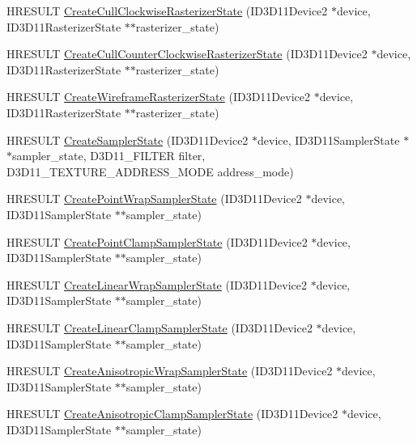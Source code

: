 \begin{DoxyCompactItemize}
\item 
H\+R\+E\+S\+U\+LT \hyperlink{namespacemage_a033a0ae29692c9fc223e532b7487aed5}{Create\+Cull\+Clockwise\+Rasterizer\+State} (I\+D3\+D11\+Device2 $\ast$device, I\+D3\+D11\+Rasterizer\+State $\ast$$\ast$rasterizer\+\_\+state)
\item 
H\+R\+E\+S\+U\+LT \hyperlink{namespacemage_a9d5863bf2519cdac7a59c39dec10b938}{Create\+Cull\+Counter\+Clockwise\+Rasterizer\+State} (I\+D3\+D11\+Device2 $\ast$device, I\+D3\+D11\+Rasterizer\+State $\ast$$\ast$rasterizer\+\_\+state)
\item 
H\+R\+E\+S\+U\+LT \hyperlink{namespacemage_a697c6623ef997684945849dc04437a1a}{Create\+Wireframe\+Rasterizer\+State} (I\+D3\+D11\+Device2 $\ast$device, I\+D3\+D11\+Rasterizer\+State $\ast$$\ast$rasterizer\+\_\+state)
\item 
H\+R\+E\+S\+U\+LT \hyperlink{namespacemage_aba8cfdff9edf018ab6ebe2f3f72a2095}{Create\+Sampler\+State} (I\+D3\+D11\+Device2 $\ast$device, I\+D3\+D11\+Sampler\+State $\ast$$\ast$sampler\+\_\+state, D3\+D11\+\_\+\+F\+I\+L\+T\+ER filter, D3\+D11\+\_\+\+T\+E\+X\+T\+U\+R\+E\+\_\+\+A\+D\+D\+R\+E\+S\+S\+\_\+\+M\+O\+DE address\+\_\+mode)
\item 
H\+R\+E\+S\+U\+LT \hyperlink{namespacemage_a172296a60b063da1f01ad0a4ec828772}{Create\+Point\+Wrap\+Sampler\+State} (I\+D3\+D11\+Device2 $\ast$device, I\+D3\+D11\+Sampler\+State $\ast$$\ast$sampler\+\_\+state)
\item 
H\+R\+E\+S\+U\+LT \hyperlink{namespacemage_a9f3a3ef8e9a08654f98dfaa2e6c77da8}{Create\+Point\+Clamp\+Sampler\+State} (I\+D3\+D11\+Device2 $\ast$device, I\+D3\+D11\+Sampler\+State $\ast$$\ast$sampler\+\_\+state)
\item 
H\+R\+E\+S\+U\+LT \hyperlink{namespacemage_a714981745a2e53e5c55b04c4441bd2d0}{Create\+Linear\+Wrap\+Sampler\+State} (I\+D3\+D11\+Device2 $\ast$device, I\+D3\+D11\+Sampler\+State $\ast$$\ast$sampler\+\_\+state)
\item 
H\+R\+E\+S\+U\+LT \hyperlink{namespacemage_aa8f37da8dc3c10b5e4e1cd56be94ff95}{Create\+Linear\+Clamp\+Sampler\+State} (I\+D3\+D11\+Device2 $\ast$device, I\+D3\+D11\+Sampler\+State $\ast$$\ast$sampler\+\_\+state)
\item 
H\+R\+E\+S\+U\+LT \hyperlink{namespacemage_a38bc123db04b8434276d3a350b5acc7f}{Create\+Anisotropic\+Wrap\+Sampler\+State} (I\+D3\+D11\+Device2 $\ast$device, I\+D3\+D11\+Sampler\+State $\ast$$\ast$sampler\+\_\+state)
\item 
H\+R\+E\+S\+U\+LT \hyperlink{namespacemage_af85f5fe2b35fb8992c3eea69e87ad039}{Create\+Anisotropic\+Clamp\+Sampler\+State} (I\+D3\+D11\+Device2 $\ast$device, I\+D3\+D11\+Sampler\+State $\ast$$\ast$sampler\+\_\+state)

\end{DoxyCompactItemize}
